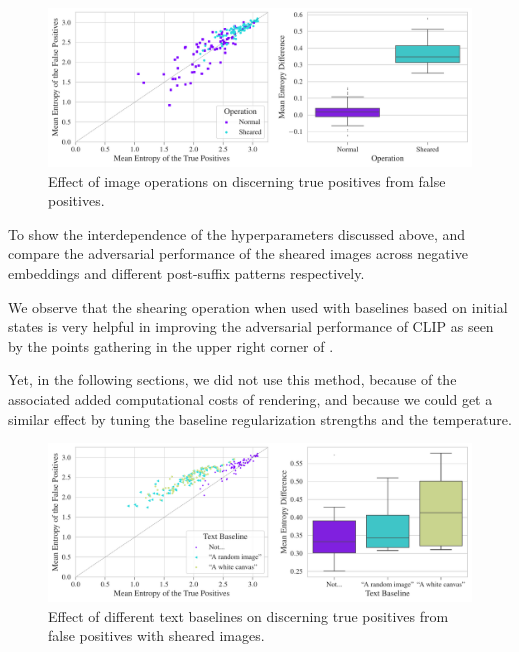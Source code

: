 \begin{figure}[H]
    \centering
    \includegraphics[width=\textwidth]{images/texturing-operations_adversarial_2.pdf}
    \caption{Effect of image operations on discerning true positives from false positives.}
    \label{fig:texturing-operations-adversarial}
\end{figure}

To show the interdependence of the hyperparameters discussed above,  and   compare the adversarial performance of the sheared images across negative embeddings and different post-suffix patterns respectively.

We observe that the shearing operation when used with baselines based on initial states is very helpful in improving the adversarial performance of CLIP as seen by the points gathering in the upper right corner of .

Yet, in the following sections, we did not use this method, because of the associated added computational costs of rendering, and because we could get a similar effect by tuning the baseline regularization strengths and the temperature.

\begin{figure}[H]
    \centering
    \includegraphics[width=\textwidth]{images/baseline_sheared_adversarial_2.pdf}
    \caption{Effect of different text baselines on discerning true positives from false positives with sheared images.}
    \label{fig:baseline_sheared_adversarial}
\end{figure}

